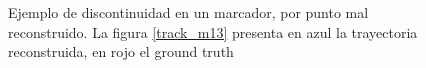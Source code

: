 \begin{itemize}
\begin{figure}[H]
 \centering
 \caption{Ejemplo de discontinuidad en un marcador, por punto mal reconstruido. La figura \ref{track_m13} presenta en azul la trayectoria reconstruida, en rojo el ground truth}
 \label{discontinuidad_tracking}
\end{figure}


\end{itemize}
